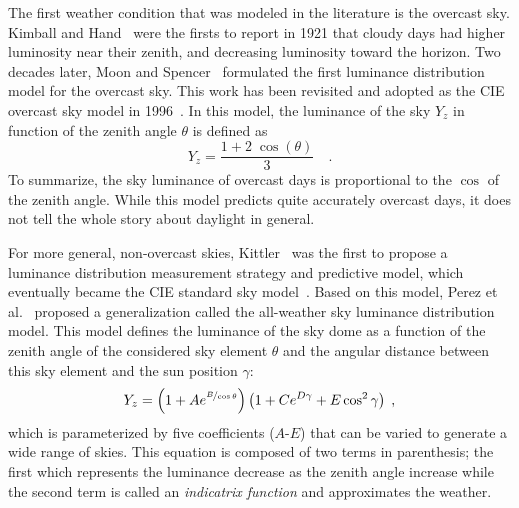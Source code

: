 The first weather condition that was modeled in the literature is the overcast sky. Kimball and Hand~\cite{kimball1921sky} were the firsts to report in 1921 that cloudy days had higher luminosity near their zenith, and decreasing luminosity toward the horizon. Two decades later, Moon and Spencer~\cite{moon1942illumination} formulated the first luminance distribution model for the overcast sky. This work has been revisited and adopted as the CIE overcast sky model in 1996~\cite{cie1996s}. In this model, the luminance of the sky $Y_z$ in function of the zenith angle $\theta$ is defined as
\begin{equation}
Y_z = \frac{1 + 2 \; \cos\left( \theta \right)}{3} \quad.
\end{equation}
To summarize, the sky luminance of overcast days is proportional to the $\cos$ of the zenith angle. While this model predicts quite accurately overcast days, it does not tell the whole story about daylight in general.


For more general, non-overcast skies, Kittler~\cite{kittler1985luminance} was the first to propose a luminance distribution measurement strategy and predictive model, which eventually became the CIE standard sky model~\cite{darula-cie-sky}. Based on this model, Perez et al.~\cite{perez1993allweather} proposed a generalization called the all-weather sky luminance distribution model. This model defines the luminance of the sky dome as a function of the zenith angle of the considered sky element $\theta$ and the angular distance between this sky element and the sun position $\gamma$:
\begin{equation}
Y_z = \left( 1 + A e^{\nicefrac{B}{\cos\theta}} \right)\left( 1 + C e^{D\gamma} + E \cos^2 \gamma \right) \;,
\end{equation}
which is parameterized by five coefficients ($A$-$E$) that can be varied to generate a wide range of skies. This equation is composed of two terms in parenthesis; the first which represents the luminance decrease as the zenith angle increase while the second term is called an \emph{indicatrix function} and approximates the weather.

